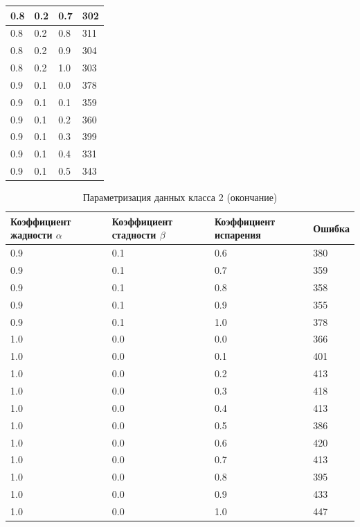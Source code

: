 \documentclass{bmstu}[a4paper]
\begin{document}
\begin{longtable}{|p{}|p{}|p{}|p{}|}
	0.8 &  0.2 &  0.7 &   302 \\\hline
	0.8 &  0.2 &  0.8 &   311 \\\hline
	0.8 &  0.2 &  0.9 &   304 \\\hline
	0.8 &  0.2 &  1.0 &   303 \\\hline
	0.9 &  0.1 &  0.0 &   378 \\\hline
	0.9 &  0.1 &  0.1 &   359 \\\hline
	0.9 &  0.1 &  0.2 &   360 \\\hline
	0.9 &  0.1 &  0.3 &   399 \\\hline
	0.9 &  0.1 &  0.4 &   331 \\\hline
	0.9 &  0.1 &  0.5 &   343 \\\hline
\end{longtable}

\begin{longtable}{|p{}|p{}|p{}|p{}|}
	\caption{Параметризация данных класса 2 (окончание)}\label{tbl:b_log_end2}  \\\hline
	Коэффициент жадности $\alpha$ & Коэффициент стадности $\beta$ & Коэффициент испарения & Ошибка   \\\hline
	\endfirsthead
	0.9 &  0.1 &  0.6 &   380 \\\hline
	0.9 &  0.1 &  0.7 &   359 \\\hline
	0.9 &  0.1 &  0.8 &   358 \\\hline
	0.9 &  0.1 &  0.9 &   355 \\\hline
	0.9 &  0.1 &  1.0 &   378 \\\hline
	1.0 &  0.0 &  0.0 &   366 \\\hline
	1.0 &  0.0 &  0.1 &   401 \\\hline
	1.0 &  0.0 &  0.2 &   413 \\\hline
	1.0 &  0.0 &  0.3 &   418 \\\hline
	1.0 &  0.0 &  0.4 &   413 \\\hline
	1.0 &  0.0 &  0.5 &   386 \\\hline
	1.0 &  0.0 &  0.6 &   420 \\\hline
	1.0 &  0.0 &  0.7 &   413 \\\hline
	1.0 &  0.0 &  0.8 &   395 \\\hline
	1.0 &  0.0 &  0.9 &   433 \\\hline
	1.0 &  0.0 &  1.0 &   447 \\\hline
\end{longtable}
\end{document}
